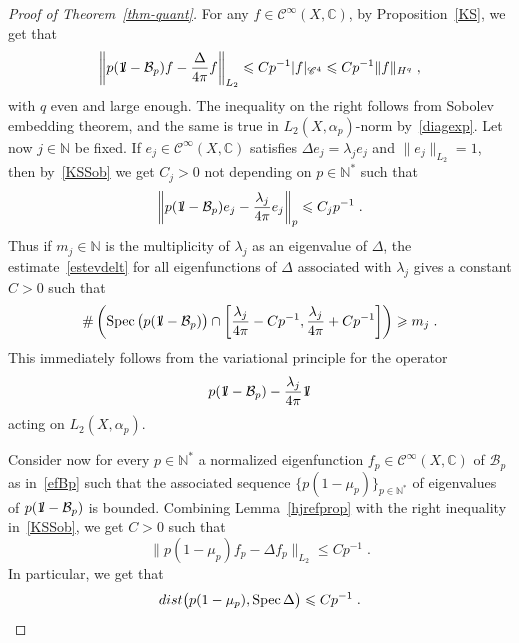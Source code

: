 \documentclass[11pt]{article}
\theoremstyle{definition}
\numberwithin{equation}{section}
\numberwithin{figure}{section}
\numberwithin{table}{section}
\DeclareMathOperator{\Spec}{Spec}
\newcommand{\N}{{\mathbb{N}}}
\newcommand{\CCC}{{\mathbb{C}}}
\newcommand{\CC}{\mathcal{C}}
\newcommand{\cB}{{\mathcal{B}}}
\newcommand*\id{{1\hskip-2.5pt{\rm l}}}
\renewcommand\leq {\leqslant}
\renewcommand\geq {\geqslant}
\newcommand\< {\mathcal{h}}
\renewcommand\> {\mathcal{i}}
\newcommand{\cinf}{\CC^\infty}
\newcommand*\cC{\mathscr{C}}
\begin{document}
\begin{proof}[Proof of Theorem~\ref{thm-quant}]
For any $f\in\cinf(X,\CCC)$, by Proposition~\ref{KS}, we get that
\begin{equation}\label{KSSob}
\left\|p(\id-\cB_p)f-\frac{\Delta}{4\pi}f\right\|_{L_2}
\leq Cp^{-1}|f|_{\cC^{4}}
\leq Cp^{-1}\|f\|_{H^{q}}\;,
\end{equation}
with $q$ even and large enough. The inequality on the right follows from Sobolev embedding theorem, and the same is true in $L_2(X,\alpha_p)$-norm by~\eqref{diagexp}. Let now $j\in\N$ be fixed. If $e_j\in\cinf(X,\CCC)$ satisfies $\Delta e_j=\lambda_j e_j$ and $\|e_j\|_{L_2}=1$, then by~\eqref{KSSob} we get $C_j>0$ not depending on $p\in\N^*$ such that
\begin{equation}\label{estevdelt}
\left\|p(\id-\cB_p)e_j-\frac{\lambda_j}{4\pi}e_j\right\| _p\leq C_j p^{-1}\;.
\end{equation}
Thus if $m_j\in\N$ is the multiplicity of $\lambda_j$ as an eigenvalue of $\Delta$, the estimate~\eqref{estevdelt} for all eigenfunctions of $\Delta$ associated with $\lambda_j$ gives a constant $C>0$ such that
\begin{equation}\label{spec>}
\#\left(\Spec\big(p(\id-\cB_p)\big)\cap\left[\frac{\lambda_j}{4\pi}-Cp^{-1},\frac{\lambda_j}{4\pi}+Cp^{-1}\right]\right)
\geq m_j\;.
\end{equation}
This immediately follows from the variational principle for the operator
\[
p(\id-\cB_p)-\frac{\lambda_j}{4\pi}\id
\]
acting on $L_2(X,\alpha_p)$.


Consider now for every $p\in\N^*$ a normalized eigenfunction $f_p\in\cinf(X,\CCC)$ of $\cB_p$ as in~\eqref{efBp} such that the associated sequence $\{p(1-\mu_p)\}_{p\in\N^*}$ of eigenvalues of $p(\id-\cB_p)$ is bounded. Combining Lemma~\ref{hjrefprop} with the right inequality in~\eqref{KSSob}, we get $C>0$ such that
\begin{equation}\label{specinv>}
\big\|p(1-\mu_p)f_p-\Delta f_p\big\|_{L_2}\leq Cp^{-1}\;.
\end{equation}
In particular, we get that
\begin{equation}\label{eq-spec-est}
\textup{dist}\big(p(1-\mu_p),\Spec\Delta\big)\leq Cp^{-1}\;.
\end{equation}


\end{proof}
\end{document}
